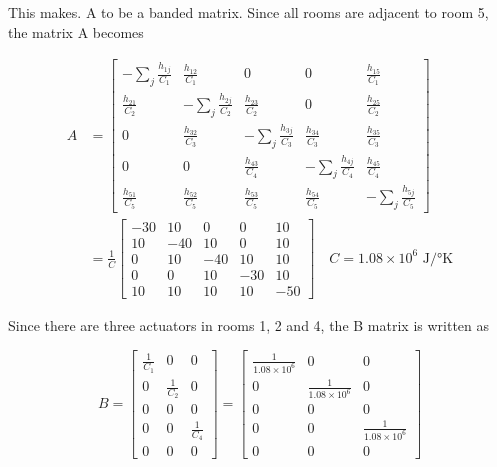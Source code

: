 \documentclass[12pt,A4, onecolumn]{exam}
\begin{document}
\begin{questions}
\begin{solution}
\begin{parts}
    This makes. A to be a banded matrix. Since all rooms are adjacent to room 5, the matrix A becomes 

    \begin{align*}
      A &= \begin{bmatrix}
            -  \sum_{ j }^{  } \frac{ h_{1j} }{ C_1 } & \frac{ h_{12} }{ C_1 } &0 &0 &\frac{ h_{15} }{ C_1 } \\
            \frac{ h_{21} }{ C_2 } &  -  \sum_{ j }^{  } \frac{ h_{2j} }{ C_2 } & \frac{ h_{23} }{ C_2 } & 0 & \frac{ h_{25} }{ C_2 } \\
            0 &  \frac{ h_{32} }{ C_3 } &  -  \sum_{ j }^{  } \frac{ h_{3j} }{ C_3 } & \frac{ h_{34} }{ C_3 } & \frac{ h_{35} }{ C_3 } \\
            0 & 0 & \frac{ h_{43} }{ C_4 } &  -  \sum_{ j }^{  } \frac{ h_{4j} }{ C_4 } & \frac{ h_{45} }{ C_4 } \\
            \frac{ h_{51} }{ C_5 } & \frac{ h_{52} }{ C_5 } & \frac{ h_{53} }{ C_5 } & \frac{ h_{54} }{ C_5 } & -  \sum_{ j }^{  } \frac{ h_{5j} }{ C_5 } 
        \end{bmatrix}\\
        &= \frac{ 1 }{ C } \begin{bmatrix}
            -30 & 10 & 0 &0&10\\
            10&-40&10&0&10\\
            0&10&-40&10&10\\
            0&0&10&-30&10\\
            10&10&10&10&-50
        \end{bmatrix}  \quad C = 1.08 \times 10^6 \text{ J/°K}
    \end{align*}
    
      
    Since there are three actuators in rooms 1, 2 and 4, the B matrix is written as 

    \[
        B = \begin{bmatrix}
            \frac{ 1 }{ C_1 }&0&0\\
            0& \frac{ 1 }{ C_2 }&0\\
            0&0&0\\
            0&0& \frac{ 1 }{ C_4 }\\
            0&0&0
        \end{bmatrix}  = \begin{bmatrix}
            \frac{ 1 }{ 1.08\times 10^6 }&0&0\\
            0& \frac{ 1 }{ 1.08\times 10^6 }&0\\
            0&0&0\\
            0&0& \frac{ 1 }{ 1.08\times 10^6 }\\
            0&0&0
        \end{bmatrix} 
    \]
    

\end{parts}
\end{solution}
\end{questions}
\end{document}
